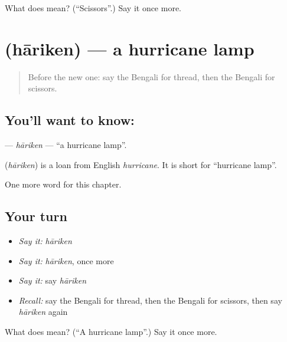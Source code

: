 \begin{tcolorbox}[breakable,colback=teal!4,colframe=teal!35!black,title={Before you move on}]
What does  mean? (\textquotedblleft{}Scissors\textquotedblright{}.) Say it once more.
\end{tcolorbox}
\section[\texorpdfstring{\bn{হারিকেন} (hāriken)}{হারিকেন (hāriken)}]{ (hāriken) — a hurricane lamp}

\label{lesson:BN-C110-hariken}



\begin{quote}
Before the new one: say the Bengali for thread, then the Bengali for scissors.
\end{quote}

\subsection*{You'll want to know: }
\textbf{} — \emph{hāriken} — \textquotedblleft{}a hurricane lamp\textquotedblright{}.

\begin{cousinweb}
\textbf{} (\emph{hāriken}) is a loan from English \emph{hurricane}. It is short for \textquotedblleft{}hurricane lamp\textquotedblright{}.
\end{cousinweb}

\begin{grammarlens}[title={What you've built}]
One more word for this chapter.
\end{grammarlens}

\subsection*{Your turn}
\begin{itemize}
\raggedright
  \item \emph{Say it:} \emph{hāriken}
  \item \emph{Say it:} \emph{hāriken}, once more
  \item \emph{Say it:} say \emph{hāriken}
  \item \emph{Recall:} say the Bengali for thread, then the Bengali for scissors, then say \emph{hāriken} again
\end{itemize}

\begin{tcolorbox}[breakable,colback=teal!4,colframe=teal!35!black,title={Before you move on}]
What does  mean? (\textquotedblleft{}A hurricane lamp\textquotedblright{}.) Say it once more.
\end{tcolorbox}
